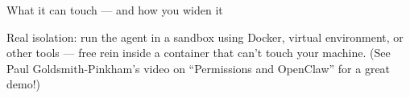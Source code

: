 \documentclass[aspectratio=169, 10pt]{beamer}
\begin{document}
\begin{frame}{What it can touch --- and how you widen it}
\vfill
\begin{tcolorbox}[advancedbox]
\scriptsize Real isolation: run the agent in a sandbox using Docker, virtual environment, or other tools --- free rein inside a container that can't touch your machine. (See Paul Goldsmith-Pinkham's video on ``Permissions and OpenClaw'' for a great demo!)
\end{tcolorbox}
\end{frame}


%
%
%
%
\end{document}
